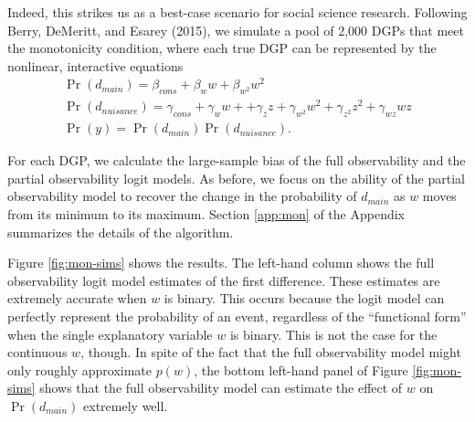 \documentclass[10pt]{article}
\begin{document}
Indeed, this strikes us as a best-case scenario for social science research. 
Following Berry, DeMeritt, and Esarey (2015), we simulate a pool of 2,000 DGPs that meet the monotonicity condition, where each true DGP can be represented by the nonlinear, interactive equations
\begin{gather*}
\Pr(d_{main}) = \beta_{cons} + \beta_w w + \beta_{w^2} w^2 \\
\Pr(d_{nuisance}) = \gamma_{cons} + \gamma_w w + + \gamma_z z + \gamma_{w^2} w^2 + \gamma_{z^2} z^2 + \gamma_{wz} wz \\
\Pr(y) = \Pr(d_{main})\Pr(d_{nuisance})\text{.}
\end{gather*}

For each DGP, we calculate the large-sample bias of the full observability and the partial observability logit models. 
As before, we focus on the ability of the partial observability model to recover the change in the probability of $d_{main}$ as $w$ moves from its minimum to its maximum. Section \ref{app:mon} of the Appendix summarizes the details of the algorithm.

Figure \ref{fig:mon-sims} shows the results. 
The left-hand column shows the full observability logit model estimates of the first difference. 
These estimates are extremely accurate when $w$ is binary. 
This occurs because the logit model can perfectly represent the probability of an event, regardless of the ``functional form'' when the single explanatory variable $w$ is binary. 
This is not the case for the continuous $w$, though. 
In spite of the fact that the full observability model might only roughly approximate $p(w)$, the bottom left-hand panel of Figure \ref{fig:mon-sims} shows that the full observability model can estimate the effect of $w$ on $\Pr(d_{main})$ extremely well.
\end{document}
